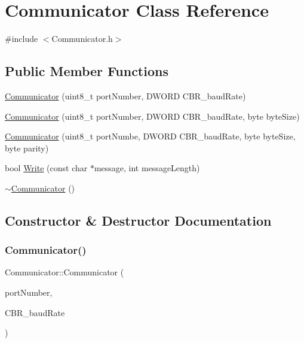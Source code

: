 \hypertarget{class_communicator}{}\section{Communicator Class Reference}
\label{class_communicator}


{\ttfamily \#include $<$Communicator.\+h$>$}

\subsection*{Public Member Functions}
\begin{DoxyCompactItemize}
\item 
\mbox{\hyperlink{class_communicator_aacc43c8cc9fc1d2d6d8f55f18f3a6a69}{Communicator}} (uint8\+\_\+t port\+Number, D\+W\+O\+RD C\+B\+R\+\_\+baud\+Rate)
\item 
\mbox{\hyperlink{class_communicator_ac3274a4f40c669f4db2e7fe4f239d018}{Communicator}} (uint8\+\_\+t port\+Number, D\+W\+O\+RD C\+B\+R\+\_\+baud\+Rate, byte byte\+Size)
\item 
\mbox{\hyperlink{class_communicator_a86b21e90bb3c1c8afedcc2c1e523c79c}{Communicator}} (uint8\+\_\+t port\+Numbe, D\+W\+O\+RD C\+B\+R\+\_\+baud\+Rate, byte byte\+Size, byte parity)
\item 
bool \mbox{\hyperlink{class_communicator_adfc4f5c9dc389520bcd6d49214564b06}{Write}} (const char $\ast$message, int message\+Length)
\item 
\mbox{\hyperlink{class_communicator_a4ced5362bf7438924f8d7f1b0c5ec391}{$\sim$\+Communicator}} ()
\end{DoxyCompactItemize}


\subsection{Constructor \& Destructor Documentation}
\mbox{\label{class_communicator_aacc43c8cc9fc1d2d6d8f55f18f3a6a69}} 
\subsubsection{\texorpdfstring{Communicator()}{Communicator()}\hspace{0.1cm}{\footnotesize\ttfamily [1/3]}}
{\footnotesize\ttfamily Communicator\+::\+Communicator (\begin{DoxyParamCaption}\item[{uint8\+\_\+t}]{port\+Number,  }\item[{D\+W\+O\+RD}]{C\+B\+R\+\_\+baud\+Rate }\end{DoxyParamCaption})}

